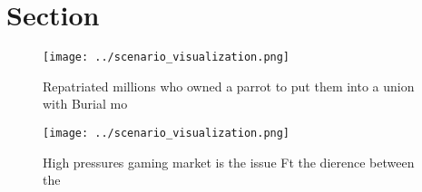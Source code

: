 \documentclass[a4paper]{article}
\begin{document}
\section{Section}

\begin{figure}
\centering
\texttt{[image: ../scenario\_visualization.png]}
\caption{Repatriated millions who owned a parrot to put them into a union with Burial mo
}
\end{figure}
 
\begin{figure}
\centering
\texttt{[image: ../scenario\_visualization.png]}
\caption{High pressures gaming market is the issue Ft the dierence between the
}
\end{figure}
 
\end{document}
